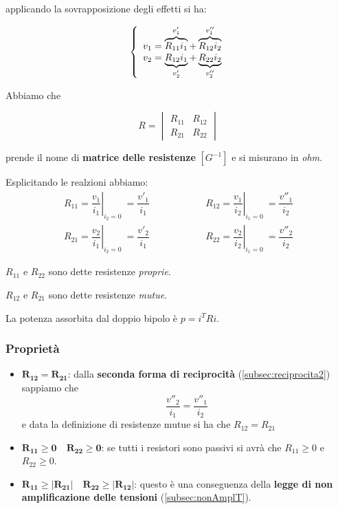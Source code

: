 \documentclass[a4paper]{report}
\begin{document}
applicando la sovrapposizione degli effetti si ha:

\[
\left\{
\begin{array}{l l}
  v_1=\overbrace{R_{11}i_1}^{v'_1}+\overbrace{R_{12}i_2}^{v''_1}\\
  v_2=\underbrace{R_{12}i_1}_{v'_2}+\underbrace{R_{22}i_2}_{v''_2}
\end{array}\right.
\]

Abbiamo che

\[
R=
\begin{vmatrix}
  R_{11} & R_{12}\\
  R_{21} & R_{22}
\end{vmatrix}
\]

prende il nome di {\bf matrice delle resistenze} $[G^{-1}]$ e si
misurano in \emph{ohm}.

Esplicitando le realzioni abbiamo:
\[
\begin{matrix}
  R_{11}=\left. \dfrac{v_1}{i_1}\right|_{i_2=0} \ =\dfrac{v'_1}{i_1} &
  \quad \quad \quad \quad \quad
  R_{12}=\left. \dfrac{v_1}{i_2}\right|_{i_1=0} \ =\dfrac{v''_1}{i_2}\\[.5cm]
  R_{21}=\left. \dfrac{v_2}{i_1}\right|_{i_2=0} \ =\dfrac{v'_2}{i_1} &
  \quad \quad \quad \quad \quad
  R_{22}=\left. \dfrac{v_2}{i_2}\right|_{i_1=0} \ =\dfrac{v''_2}{i_2}
\end{matrix}
\]

$R_{11}$ e $R_{22}$ sono dette resistenze \emph{proprie}.

$R_{12}$ e $R_{21}$ sono dette resistenze \emph{mutue}.

\vspace{0.5cm}
La potenza assorbita dal doppio bipolo \`e $p=i^TRi$.

\subsubsection{Propriet\`a}

\begin{itemize}
  \item $\mathbf{R_{12}=R_{21}}$: dalla {\bf seconda forma di
    reciprocit\`a} (\ref{subsec:reciprocita2}) sappiamo che
    \[
    \dfrac{v''_2}{i_1}=\dfrac{v''_1}{i_2}
    \]
    e data la definizione di resistenze mutue si ha che
    $R_{12}=R_{21}$
  \item $\mathbf{R_{11} \geq 0 \quad R_{22}\geq 0}$: se tutti i
    resistori sono passivi si avr\`a che $R_{11} \geq 0$ e $R_{22}\geq
    0$.
  \item $\mathbf{R_{11} \geq |R_{21}| \quad R_{22} \geq |R_{12}|}$:
    questo \`e una conseguenza della {\bf legge di non amplificazione
      delle tensioni} (\ref{subsec:nonAmplT}).
\end{itemize}
\end{document}

